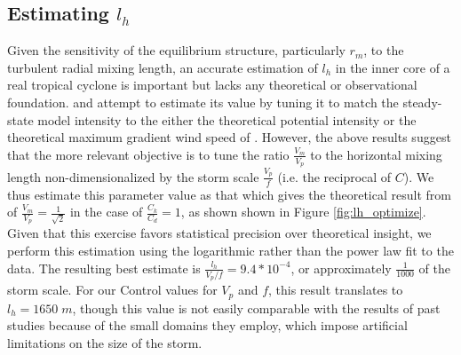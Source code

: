\documentclass[12pt]{article}
\begin{document}

\subsection{Estimating $l_h$}
Given the sensitivity of the equilibrium structure, particularly $r_m$, to the turbulent radial mixing length, an accurate estimation of $l_h$ in the inner core of a real tropical cyclone is important but lacks any theoretical or observational foundation. \cite{Bryan_Rotunno_2009b} and \cite{Bryan_2011} attempt to estimate its value by tuning it to match the steady-state model intensity to the either the theoretical potential intensity or the theoretical maximum gradient wind speed of \cite{Emanuel_Rotunno_2011}.  However, the above results suggest that the more relevant objective is to tune the ratio $\frac{V_m}{V_p}$ to the horizontal mixing length non-dimensionalized by the storm scale $\frac{V_p}{f}$ (i.e. the reciprocal of $C$). We thus estimate this parameter value as that which gives the theoretical result from \cite{Emanuel_Rotunno_2011} of $\frac{V_m}{V_p} = \frac{1}{\sqrt{2}}$ in the case of $\frac{C_k}{C_d}=1$, as shown shown in Figure \ref{fig:lh_optimize}. Given that this exercise favors statistical precision over theoretical insight, we perform this estimation using the logarithmic rather than the power law fit to the data. The resulting best estimate is $\frac{l_h}{V_p/f} = 9.4*10^{-4}$, or approximately $\frac{1}{1000}$ of the storm scale.  For our Control values for $V_p$ and $f$, this result translates to $l_h = 1650 \; m$, though this value is not easily comparable with the results of past studies because of the small domains they employ, which impose artificial limitations on the size of the storm.
\end{document}
